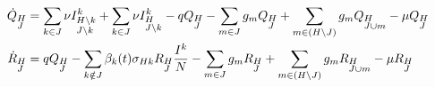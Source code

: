 \begin{footnotesize}
\begin{align}
    \dot{Q}_{\begin{subarray}{l}H\\ J \end{subarray}} &= \sum_{k \in
      J} \nu I^k_{\begin{subarray}{l}H \setminus k \\ J \setminus
        k \end{subarray}} +\sum_{k \in J} \nu
    I^k_{\begin{subarray}{l}H \\ J \setminus k \end{subarray}} -q
    Q_{\begin{subarray}{l}H \\ J\end{subarray}} -\sum_{m \in J} g_m
    Q_{\begin{subarray}{l}H \\ J\end{subarray}} + \sum_{m \in (H
      \setminus J )} g_m Q_{\begin{subarray}{l}H \\ J \cup
        m \end{subarray}} -\mu
    Q_{\begin{subarray}{l}H \\ J \end{subarray}} \notag \\
    \dot{R}_{\begin{subarray}{l}H\\ J \end{subarray}} &= q
    Q_{\begin{subarray}{l}H \\ J\end{subarray}} -\sum_{k \notin J}
    \beta_k(t) \sigma_{Hk} R_{\begin{subarray}{l}H\\ J \end{subarray}}
    \frac{I^k}{N} - \sum_{m \in J} g_m R_{\begin{subarray}{l}H\\
        J \end{subarray}} + \sum_{m \in (H \setminus J)} g_m
    R_{\begin{subarray}{l}H\\ J\cup m \end{subarray}} -\mu
    R_{\begin{subarray}{l}H\\J \end{subarray}} \notag
  \end{align}
\end{footnotesize}


